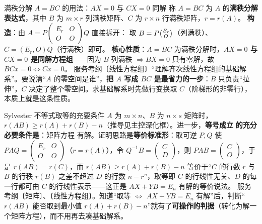 \begin{fdeep}{满秩分解 $A=BC$ 的用法：$AX=0$ 与 $CX=0$ 同解}
称 $A=BC$ 为 $A$ 的\textbf{满秩分解表达式}，其中 $B$ 为 $m\times r$ 列满秩矩阵、$C$ 为 $r\times n$ 行满秩矩阵，$r=r(A)$。
\textbf{构造}：由 $A=P\begin{pmatrix}E_r&O\\ O&O\end{pmatrix}Q$ 直接拆开：
取 $B=P\tbinom{E_r}{O}$（列满秩）、$C=(E_r,O)Q$（行满秩）即可。
\textbf{核心性质}：$A=BC$ 为满秩分解时，\textbf{$AX=0$ 与 $CX=0$ 是同解方程组}——因为 $B$ 列满秩 $\Rightarrow BX=0$ 只有零解，故 $BCx=0\iff Cx=0$。
\fbref{}服务考纲〔线性方程组〕“理解齐次线性方程组的基础解系”。要说清“$A$ 的零空间是谁”，\textbf{把 $A$ 写成 $BC$ 是最省力的一步}：$B$ 只负责“拉伸”，$C$ 决定了整个零空间。求基础解系时先做行变换取 $C$（阶梯形的非零行），本质上就是这条性质。
\end{fdeep}

\begin{fdeep}{Sylvester 不等式取等的充要条件}
$A$ 为 $m\times n$、$B$ 为 $n\times s$ 矩阵时，$r(AB)\ge r(A)+r(B)-n$（推导见主控深化框）。进一步，\textbf{等号成立}
\textbf{的充分必要条件是}：矩阵方程
有解。证明思路是\textbf{等价标准形}：取可逆 $P,Q$ 使 $PAQ=\begin{pmatrix}E_r&O\\ O&O\end{pmatrix}$（$r=r(A)$），令 $Q^{-1}B=\begin{pmatrix}C\\ D\end{pmatrix}$，则 $PAB=\begin{pmatrix}C\\ O\end{pmatrix}$，于是 $r(AB)=r(C)$，而 $r(AB)\ge r(A)+r(B)-n$ 等价于“$C$ 的行数 $r$ 与 $B$ 的行秩 $r(B)$ 之差不超过 $D$ 的行数 $n-r$”，取等即 $C$ 的行线性无关、$D$ 的每一行都可由 $C$ 的行线性表示——这正是 $AX+YB=E_n$ 有解的等价说法。
\fbref{}服务考纲〔矩阵〕、〔线性方程组〕。知道“取等 $\iff$ $AX+YB=E_n$ 有解”后，判断“$r(AB)$ 能否取到最小值 $r(A)+r(B)-n$”就有了\textbf{可操作的判据}（转化为解一个矩阵方程），而不用再去凑基础解系。
\end{fdeep}

